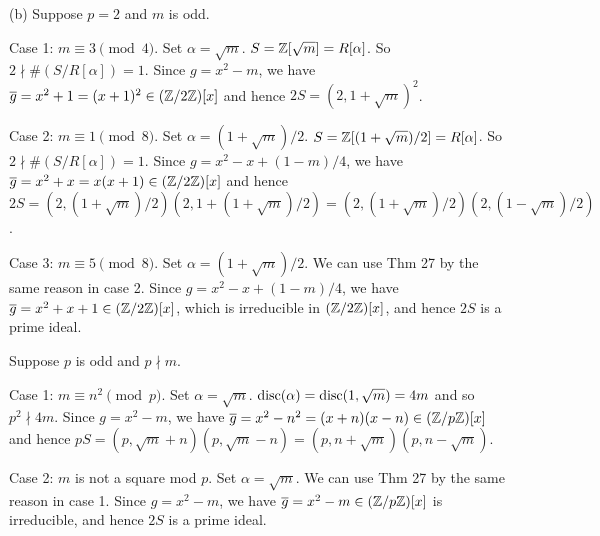 \documentclass[../Marcus.tex]{subfiles}
\begin{document}
(b) Suppose $p=2$ and $m$ is odd.

Case 1: $m\equiv3\pmod{4}$. Set $\alpha=\sqrt{m}$. $S=\mathbb{Z}[\sqrt{m}]=R[\alpha]$. So $2\nmid \#(S/R[\alpha])=1$. Since $g=x^2-m$, we have $\overline{g}=x^2+1=(x+1)^2\in(\mathbb{Z}/2\mathbb{Z})[x]$ and hence $2S=(2,1+\sqrt{m})^2$.

Case 2: $m\equiv1\pmod{8}$. Set $\alpha=(1+\sqrt{m})/2$. $S=\mathbb{Z}[(1+\sqrt{m})/2]=R[\alpha]$. So $2\nmid \#(S/R[\alpha])=1$. Since $g=x^2-x+(1-m)/4$, we have $\overline{g}=x^2+x=x(x+1)\in(\mathbb{Z}/2\mathbb{Z})[x]$ and hence $2S=(2,(1+\sqrt{m})/2)(2,1+(1+\sqrt{m})/2)=(2,(1+\sqrt{m})/2)(2,(1-\sqrt{m})/2)$.

Case 3: $m\equiv5\pmod{8}$. Set $\alpha=(1+\sqrt{m})/2$. We can use Thm 27 by the same reason in case 2. Since $g=x^2-x+(1-m)/4$, we have $\overline{g}=x^2+x+1\in(\mathbb{Z}/2\mathbb{Z})[x]$, which is irreducible in $(\mathbb{Z}/2\mathbb{Z})[x]$, and hence $2S$ is a prime ideal.

Suppose $p$ is odd and $p\nmid m$.

Case 1: $m\equiv n^2\pmod{p}$. Set $\alpha=\sqrt{m}$. $\operatorname{disc}(\alpha)=\operatorname{disc}(1,\sqrt{m})=4m$ and so $p^2\nmid 4m$. Since $g=x^2-m$, we have $\overline{g}=x^2-n^2=(x+n)(x-n)\in(\mathbb{Z}/p\mathbb{Z})[x]$ and hence $pS=(p,\sqrt{m}+n)(p,\sqrt{m}-n)=(p,n+\sqrt{m})(p,n-\sqrt{m})$.

Case 2: $m$ is not a square mod $p$. Set $\alpha=\sqrt{m}$. We can use Thm 27 by the same reason in case 1. Since $g=x^2-m$, we have $\overline{g}=x^2-m\in(\mathbb{Z}/p\mathbb{Z})[x]$ is irreducible, and hence $2S$ is a prime ideal.
\end{document}
